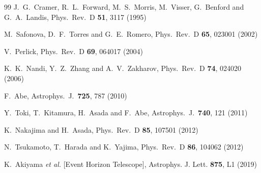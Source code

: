 \documentclass[aps,prd,12pt,superscriptaddress]{revtex4-2}
\begin{document}
\begin{thebibliography}{99}
  J.~G.~Cramer, R.~L.~Forward, M.~S.~Morris, M.~Visser, G.~Benford and G.~A.~Landis,
  Phys.\ Rev.\ D {\bf 51}, 3117 (1995)

  M.~Safonova, D.~F.~Torres and G.~E.~Romero,
  Phys.\ Rev.\ D {\bf 65}, 023001 (2002)

  V.~Perlick,
  Phys.\ Rev.\ D {\bf 69}, 064017 (2004)

  K.~K.~Nandi, Y.~Z.~Zhang and A.~V.~Zakharov,
  Phys.\ Rev.\ D {\bf 74}, 024020 (2006)

  F.~Abe,
  Astrophys.\ J.\  {\bf 725}, 787 (2010)

  Y.~Toki, T.~Kitamura, H.~Asada and F.~Abe,
  Astrophys.\ J.\  {\bf 740}, 121 (2011)

  K.~Nakajima and H.~Asada,
  Phys.\ Rev.\ D {\bf 85}, 107501 (2012)

  N.~Tsukamoto, T.~Harada and K.~Yajima,
  Phys.\ Rev.\ D {\bf 86}, 104062 (2012)

K.~Akiyama \textit{et al.} [Event Horizon Telescope],
Astrophys. J. Lett. \textbf{875}, L1 (2019)


\end{thebibliography}
\end{document}
